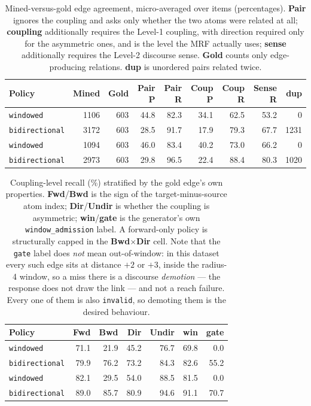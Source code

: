 \documentclass[11pt]{article}
\begin{document}
\begin{table}[htbp]
\centering
\small
\caption{Mined-versus-gold edge agreement, micro-averaged over items (percentages). \textbf{Pair} ignores the coupling and asks only whether the two atoms were related at all; \textbf{coupling} additionally requires the Level-1 coupling, with direction required only for the asymmetric ones, and is the level the MRF actually uses; \textbf{sense} additionally requires the Level-2 discourse sense. \textbf{Gold} counts only edge-producing relations. \textbf{dup} is unordered pairs related twice.}
\label{tab:mining-pr}
\begin{tabular}{lrrrrrrrr}
\toprule
Policy & Mined & Gold & Pair P & Pair R & Coup P & Coup R & Sense R & dup \\
\midrule
\texttt{windowed} & 1106 & 603 & 44.8 & 82.3 & 34.1 & 62.5 & 53.2 & 0 \\
\texttt{bidirectional} & 3172 & 603 & 28.5 & 91.7 & 17.9 & 79.3 & 67.7 & 1231 \\
\texttt{windowed} & 1094 & 603 & 46.0 & 83.4 & 40.2 & 73.0 & 66.2 & 0 \\
\texttt{bidirectional} & 2973 & 603 & 29.8 & 96.5 & 22.4 & 88.4 & 80.3 & 1020 \\
\bottomrule
\end{tabular}
\end{table}

\begin{table}[htbp]
\centering
\small
\caption{Coupling-level recall (\%) stratified by the gold edge's own properties. \textbf{Fwd}/\textbf{Bwd} is the sign of the target-minus-source atom index; \textbf{Dir}/\textbf{Undir} is whether the coupling is asymmetric; \textbf{win}/\textbf{gate} is the generator's own \texttt{window\_admission} label. A forward-only policy is structurally capped in the \textbf{Bwd}$\times$\textbf{Dir} cell. Note that the \texttt{gate} label does \emph{not} mean out-of-window: in this dataset every such edge sits at distance $+2$ or $+3$, inside the radius-4 window, so a miss there is a discourse \emph{demotion} --- the response does not draw the link --- and not a reach failure. Every one of them is also \texttt{invalid}, so demoting them is the desired behaviour.}
\label{tab:mining-recall-strat}
\begin{tabular}{lrrrrrr}
\toprule
Policy & Fwd & Bwd & Dir & Undir & win & gate \\
\midrule
\texttt{windowed} & 71.1 & 21.9 & 45.2 & 76.7 & 69.8 & 0.0 \\
\texttt{bidirectional} & 79.9 & 76.2 & 73.2 & 84.3 & 82.6 & 55.2 \\
\texttt{windowed} & 82.1 & 29.5 & 54.0 & 88.5 & 81.5 & 0.0 \\
\texttt{bidirectional} & 89.0 & 85.7 & 80.9 & 94.6 & 91.1 & 70.7 \\
\bottomrule
\end{tabular}
\end{table}
\end{document}
